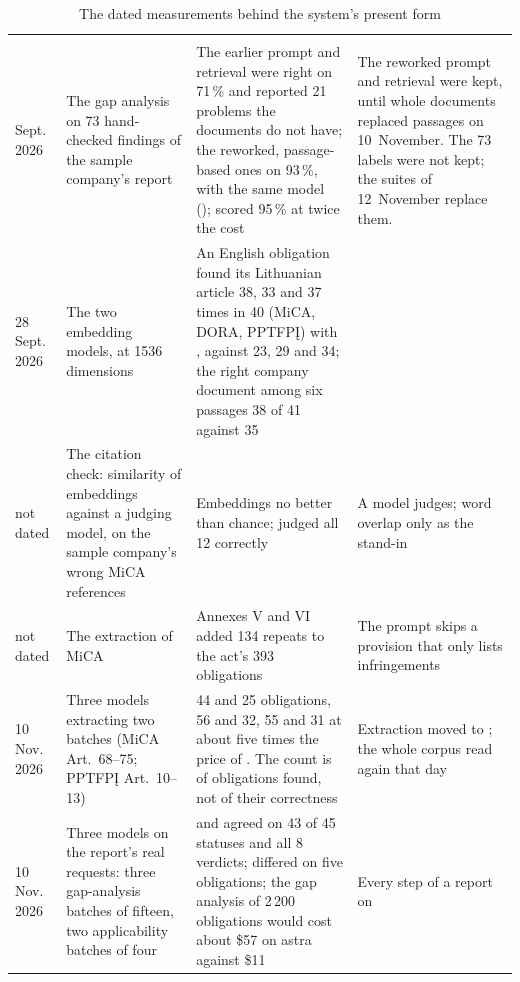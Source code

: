 \begin{xltabular}{\textwidth}{@{}L{17mm}L{37mm}YL{37mm}@{}}
\caption{The dated measurements behind the system's present form}\label{tab:control:record}\\
\toprule
{} &  &  &  \\
\midrule
\endfirsthead
\toprule
{} &  &  &  \\
\midrule
\endhead
\bottomrule
{} Sept. 2026 & The gap analysis on 73 hand-checked findings of the sample company's report & The earlier prompt and retrieval were right on 71\,\% and reported 21 problems the documents do not have; the reworked, passage-based ones on 93\,\%, with the same model ();  scored 95\,\% at twice the cost & The reworked prompt and retrieval were kept, until whole documents replaced passages on 10~November. The 73 labels were not kept; the suites of 12~November replace them. \\
28 Sept. 2026 & The two embedding models, at 1536 dimensions & An English obligation found its Lithuanian article 38, 33 and 37 times in 40 (MiCA, DORA, PPTFPĮ) with , against 23, 29 and 34; the right company document among six passages 38 of 41 against 35 &  \\
not dated & The citation check: similarity of embeddings against a judging model, on the sample company's wrong MiCA references & Embeddings no better than chance;  judged all 12 correctly & A model judges; word overlap only as the stand-in \\
not dated & The extraction of MiCA & Annexes V and VI added 134 repeats to the act's 393 obligations & The prompt skips a provision that only lists infringements \\
10 Nov. 2026 & Three models extracting two batches (MiCA Art.~68--75; PPTFPĮ Art.~10--13) &  44 and 25 obligations,  56 and 32,  55 and 31 at about five times the price of . The count is of obligations found, not of their correctness & Extraction moved to ; the whole corpus read again that day \\
10 Nov. 2026 & Three models on the report's real requests: three gap-analysis batches of fifteen, two applicability batches of four &  and  agreed on 43 of 45 statuses and all 8 verdicts;  differed on five obligations; the gap analysis of 2\,200 obligations would cost about \$57 on astra against \$11 & Every step of a report on  \\

\end{xltabular}
